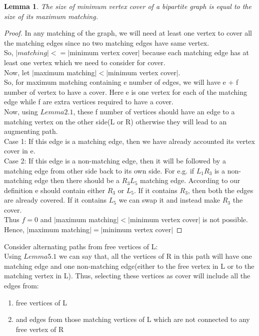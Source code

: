 \documentclass[11pt]{article}
\newtheorem{lemma}[theorem]{Lemma}
\begin{document}
\begin{lemma}
	The size of minimum vertex cover of a bipartite graph is equal to the size of its maximum matching.
\end{lemma} 
\begin{proof}
	In any matching of the graph, we will need at least one vertex to cover all the matching edges since no two matching edges
	have same vertex. \\
	So, $|matching| <= |$minimum vertex cover$|$ because each matching edge has at least one vertex which we need to consider for
	cover. \\
	Now, let $|$maximum matching$| < |$minimum vertex cover$|$. \\
	So, for maximum matching containing e number of edges, we will have e + f number of vertex to have a cover. Here e is one vertex 
	for each of the matching edge while f are extra vertices required to have a cover. \\ 
	Now, using $Lemma 2.1$, these f number of vertices should have an edge to a matching vertex on the other side(L or R) otherwise 
	they will lead to an augmenting path. \\
	Case 1: If this edge is a matching edge, then we have already accounted its vertex cover in e.\\
	Case 2: If this edge is a non-matching edge, then it will be followed by a matching edge from other side back to its own side.
	For e.g.  if $L_1 R_3$ is a non-matching edge then there should be a $R_3 L_5$ matching edge. According to our definition
	e should contain either $R_3$ or $L_5$. If it contains $R_3$, then both the edges are already covered. If it contains $L_5$
	we can swap it and instead make $R_3$ the cover. \\
	Thus $f = 0$ and  $|$maximum matching$| < |$minimum vertex cover$|$ is not possible. \\
	Hence, $|$maximum matching$| = |$minimum vertex cover$|$	
\end{proof}
Consider alternating paths from free vertices of L: \\
Using $Lemma 5.1$ we can say that, all the vertices of R in this path will have one matching edge and one non-matching edge(either to 
the free vertex in L or to the matching vertex in L). Thus, selecting these vertices as cover will include all the edges from: \\
\begin{enumerate}
	\item free vertices of L
	\item and edges from those matching vertices of L which are not connected to any free vertex of R
\end{enumerate}
\end{document}
